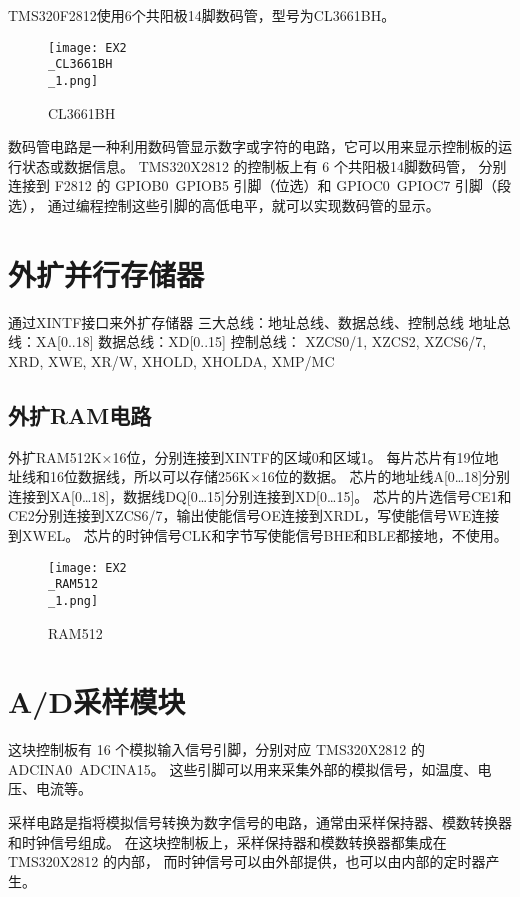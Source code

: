 \documentclass{math201}
\begin{document}
TMS320F2812使用6个共阳极14脚数码管，型号为CL3661BH。

\begin{figure}[H]  
  \centering\texttt{[image: EX2\\\_CL3661BH\\\_1.png]}  
  \caption{CL3661BH}     
\end{figure}

数码管电路是一种利用数码管显示数字或字符的电路，它可以用来显示控制板的运行状态或数据信息。
TMS320X2812 的控制板上有 6 个共阳极14脚数码管，
分别连接到 F2812 的 GPIOB0~GPIOB5 引脚（位选）和 GPIOC0~GPIOC7 引脚（段选），
通过编程控制这些引脚的高低电平，就可以实现数码管的显示。

\section{外扩并行存储器}

通过XINTF接口来外扩存储器
三大总线：地址总线、数据总线、控制总线
地址总线：XA[0..18]
数据总线：XD[0..15]
控制总线： XZCS0/1, XZCS2, XZCS6/7, XRD, XWE, XR/W, XHOLD, XHOLDA, XMP/MC

\subsection{外扩RAM电路}

外扩RAM512K×16位，分别连接到XINTF的区域0和区域1。
每片芯片有19位地址线和16位数据线，所以可以存储256K×16位的数据。
芯片的地址线A[0…18]分别连接到XA[0…18]，数据线DQ[0…15]分别连接到XD[0…15]。
芯片的片选信号CE1和CE2分别连接到XZCS6/7，输出使能信号OE连接到XRDL，写使能信号WE连接到XWEL。
芯片的时钟信号CLK和字节写使能信号BHE和BLE都接地，不使用。

\begin{figure}[H]  
  \centering\texttt{[image: EX2\\\_RAM512\\\_1.png]}  
  \caption{RAM512}     
\end{figure}

\section{A/D采样模块}

这块控制板有 16 个模拟输入信号引脚，分别对应 TMS320X2812 的 ADCINA0~ADCINA15。
这些引脚可以用来采集外部的模拟信号，如温度、电压、电流等。

采样电路是指将模拟信号转换为数字信号的电路，通常由采样保持器、模数转换器和时钟信号组成。
在这块控制板上，采样保持器和模数转换器都集成在 TMS320X2812 的内部，
而时钟信号可以由外部提供，也可以由内部的定时器产生。
\end{document}
